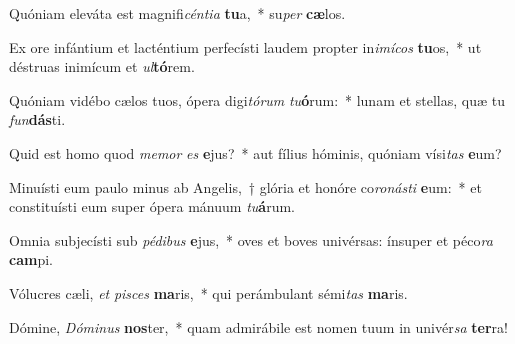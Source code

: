 \item Quóniam eleváta est magnifi\textit{cén}\textit{ti}\textit{a} \textbf{tu}a,~* su\textit{per} \textbf{cæ}los.
\item Ex ore infántium et lacténtium perfecísti laudem propter in\textit{i}\textit{mí}\textit{cos} \textbf{tu}os,~* ut déstruas inimícum et \textit{ul}\textbf{tó}rem.
\item Quóniam vidébo cælos tuos, ópera digi\textit{tó}\textit{rum} \textit{tu}\textbf{ó}rum:~* lunam et stellas, quæ tu \textit{fun}\textbf{dás}ti.
\item Quid est homo quod \textit{me}\textit{mor} \textit{es} \textbf{e}jus?~* aut fílius hóminis, quóniam vísi\textit{tas} \textbf{e}um?
\item Minuísti eum paulo minus ab Angelis,~† glória et honóre co\textit{ro}\textit{nás}\textit{ti} \textbf{e}um:~* et constituísti eum super ópera mánuum \textit{tu}\textbf{á}rum.
\item Omnia subjecísti sub \textit{pé}\textit{di}\textit{bus} \textbf{e}jus,~* oves et boves univérsas: ínsuper et péco\textit{ra} \textbf{cam}pi.
\item Vólucres cæli, \textit{et} \textit{pi}\textit{sces} \textbf{ma}ris,~* qui perámbulant sémi\textit{tas} \textbf{ma}ris.
\item Dómine, \textit{Dó}\textit{mi}\textit{nus} \textbf{nos}ter,~* quam admirábile est nomen tuum in univér\textit{sa} \textbf{ter}ra!
